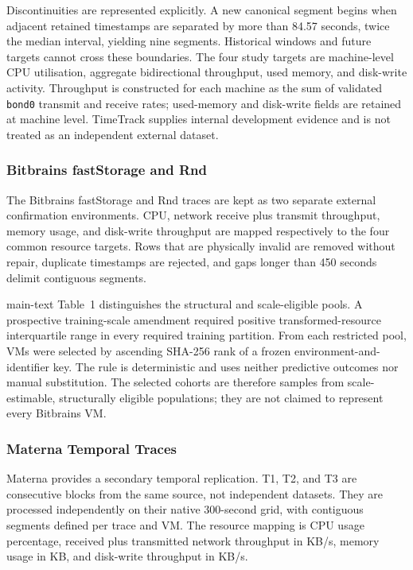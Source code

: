 \documentclass[a4paper,11pt]{article}
\begin{document}
Discontinuities are represented explicitly.  A new canonical segment begins
when adjacent retained timestamps are separated by more than 84.57 seconds,
twice the median interval, yielding nine segments.  Historical windows and
future targets cannot cross these boundaries.  The four study targets are
machine-level CPU utilisation, aggregate bidirectional throughput, used memory,
and disk-write activity.  Throughput is constructed for each machine as the sum
of validated \texttt{bond0} transmit and receive rates; used-memory and
disk-write fields are retained at machine level.  TimeTrack supplies internal
development evidence and is not treated as an independent external dataset.

\subsubsection*{Bitbrains fastStorage and Rnd}


The Bitbrains fastStorage and Rnd traces are kept as two separate external
confirmation environments.  CPU,
network receive plus transmit throughput, memory usage, and disk-write
throughput are mapped respectively to the four common resource targets.  Rows
that are physically invalid are removed without repair, duplicate timestamps
are rejected, and gaps longer than 450 seconds delimit contiguous segments.

main-text Table~1 distinguishes the structural and scale-eligible
pools. A prospective training-scale amendment required positive
transformed-resource interquartile range in every required training partition.
From each restricted pool, VMs were selected by ascending
SHA-256 rank of a frozen environment-and-identifier key.  The rule is
deterministic and uses neither predictive outcomes nor manual substitution.
The selected cohorts are therefore samples from scale-estimable, structurally
eligible populations; they are not claimed to represent every Bitbrains VM.

\subsubsection*{Materna Temporal Traces}


Materna provides a secondary temporal replication.  T1, T2, and T3 are
consecutive blocks from the same source, not independent datasets.  They are
processed independently on their native 300-second grid, with contiguous
segments defined per trace and VM.  The resource mapping is CPU usage
percentage, received plus transmitted network throughput in KB/s, memory usage
in KB, and disk-write throughput in KB/s.
\end{document}

